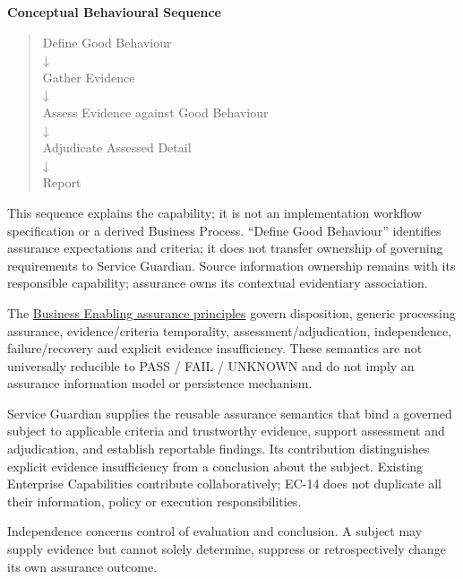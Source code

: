 \par\medskip\textbf{Conceptual Behavioural Sequence}\par


\begin{quote}\small\ttfamily
Define Good Behaviour\\
    ↓\\
Gather Evidence\\
    ↓\\
Assess Evidence against Good Behaviour\\
    ↓\\
Adjudicate Assessed Detail\\
    ↓\\
Report\\

\end{quote}


This sequence explains the capability; it is not an implementation workflow specification or a derived Business Process. “Define Good Behaviour” identifies assurance expectations and criteria; it does not transfer ownership of governing requirements to Service Guardian. Source information ownership remains with its responsible capability; assurance owns its contextual evidentiary association.



The \href{\detokenize{../../../../../../../../docs/markdown/02-strategy/capabilities/business-enabling-capabilities.md#health-service-assurance-approved-business-enabling-capabilities}}{Business Enabling assurance principles} govern disposition, generic processing assurance, evidence/criteria temporality, assessment/adjudication, independence, failure/recovery and explicit evidence insufficiency. These semantics are not universally reducible to PASS / FAIL / UNKNOWN and do not imply an assurance information model or persistence mechanism.



Service Guardian supplies the reusable assurance semantics that bind a governed subject to applicable criteria and trustworthy evidence, support assessment and adjudication, and establish reportable findings. Its contribution distinguishes explicit evidence insufficiency from a conclusion about the subject. Existing Enterprise Capabilities contribute collaboratively; EC-14 does not duplicate all their information, policy or execution responsibilities.



Independence concerns control of evaluation and conclusion. A subject may supply evidence but cannot solely determine, suppress or retrospectively change its own assurance outcome.



